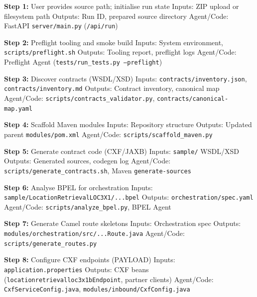 \documentclass[11pt,a4paper]{article}
\begin{document}
\begin{algorithm}[H]
\caption{End-to-End Project Workflow (Steps 1–8)}\label{alg:pseudocode-workflow-1}
\begin{algorithmic}[1]
\State \textbf{Step 1:} User provides source path; initialise run state
\Statex Inputs: ZIP upload or filesystem path
\Statex Outputs: Run ID, prepared source directory
\Statex Agent/Code: FastAPI \texttt{server/main.py} (\texttt{/api/run})

\State \textbf{Step 2:} Preflight tooling and smoke build
\Statex Inputs: System environment, \texttt{scripts/preflight.sh}
\Statex Outputs: Tooling report, preflight logs
\Statex Agent/Code: Preflight Agent (\texttt{tests/run\_tests.py --preflight})

\State \textbf{Step 3:} Discover contracts (WSDL/XSD)
\Statex Inputs: \texttt{contracts/inventory.json}, \texttt{contracts/inventory.md}
\Statex Outputs: Contract inventory, canonical map
\Statex Agent/Code: \texttt{scripts/contracts\_validator.py}, \texttt{contracts/canonical-map.yaml}

\State \textbf{Step 4:} Scaffold Maven modules
\Statex Inputs: Repository structure
\Statex Outputs: Updated parent \texttt{modules/pom.xml}
\Statex Agent/Code: \texttt{scripts/scaffold\_maven.py}

\State \textbf{Step 5:} Generate contract code (CXF/JAXB)
\Statex Inputs: \texttt{sample/} WSDL/XSD
\Statex Outputs: Generated sources, codegen log
\Statex Agent/Code: \texttt{scripts/generate\_contracts.sh}, Maven \texttt{generate-sources}

\State \textbf{Step 6:} Analyse BPEL for orchestration
\Statex Inputs: \texttt{sample/LocationRetrievalLOC3X1/...bpel}
\Statex Outputs: \texttt{orchestration/spec.yaml}
\Statex Agent/Code: \texttt{scripts/analyze\_bpel.py}, BPEL Agent

\State \textbf{Step 7:} Generate Camel route skeletons
\Statex Inputs: Orchestration spec
\Statex Outputs: \texttt{modules/orchestration/src/...Route.java}
\Statex Agent/Code: \texttt{scripts/generate\_routes.py}

\State \textbf{Step 8:} Configure CXF endpoints (PAYLOAD)
\Statex Inputs: \texttt{application.properties}
\Statex Outputs: CXF beans (\texttt{locationretrievalloc3x1bEndpoint}, partner clients)
\Statex Agent/Code: \texttt{CxfServiceConfig.java}, \texttt{modules/inbound/CxfConfig.java}
\end{algorithmic}
\end{algorithm}
\end{document}
